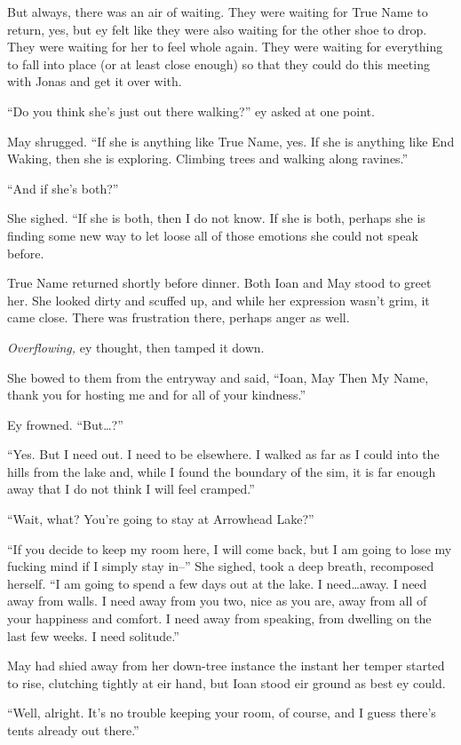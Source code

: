 But always, there was an air of waiting. They were waiting for True Name to return, yes, but ey felt like they were also waiting for the other shoe to drop. They were waiting for her to feel whole again. They were waiting for everything to fall into place (or at least close enough) so that they could do this meeting with Jonas and get it over with.

``Do you think she's just out there walking?'' ey asked at one point.

May shrugged. ``If she is anything like True Name, yes. If she is anything like End Waking, then she is exploring. Climbing trees and walking along ravines.''

``And if she's both?''

She sighed. ``If she is both, then I do not know. If she is both, perhaps she is finding some new way to let loose all of those emotions she could not speak before.

True Name returned shortly before dinner. Both Ioan and May stood to greet her. She looked dirty and scuffed up, and while her expression wasn't grim, it came close. There was frustration there, perhaps anger as well.

\emph{Overflowing,} ey thought, then tamped it down.

She bowed to them from the entryway and said, ``Ioan, May Then My Name, thank you for hosting me and for all of your kindness.''

Ey frowned. ``But\ldots?''

``Yes. But I need out. I need to be elsewhere. I walked as far as I could into the hills from the lake and, while I found the boundary of the sim, it is far enough away that I do not think I will feel cramped.''

``Wait, what? You're going to stay at Arrowhead Lake?''

``If you decide to keep my room here, I will come back, but I am going to lose my fucking mind if I simply stay in--'' She sighed, took a deep breath, recomposed herself. ``I am going to spend a few days out at the lake. I need\ldots away. I need away from walls. I need away from you two, nice as you are, away from all of your happiness and comfort. I need away from speaking, from dwelling on the last few weeks. I need solitude.''

May had shied away from her down-tree instance the instant her temper started to rise, clutching tightly at eir hand, but Ioan stood eir ground as best ey could.

``Well, alright. It's no trouble keeping your room, of course, and I guess there's tents already out there.''

